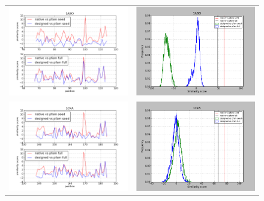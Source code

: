 \documentclass[a4paper,12pt]{article}
\begin{document}
   \begin{figure}[t]
     \centering
     \begin{tabular}{cc}
       \includegraphics[width=8.45cm]{gen_08032012/1ABO/p4/graph_simil_bypos.png} &
       \includegraphics[width=8.45cm]{gen_08032012/1ABO/p4/graph_simil_byseq.png} \\
       \includegraphics[width=8.45cm]{gen_08032012/1CKA/p4/graph_simil_bypos.png} &
       \includegraphics[width=8.45cm]{gen_08032012/1CKA/p4/graph_simil_byseq.png} \\

\end{tabular}
\end{figure}
\end{document}

